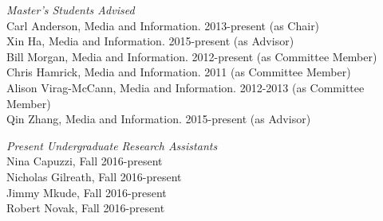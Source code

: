 \documentclass[9pt]{extarticle}
\begin{document}
\emph{Master's Students Advised} \\
Carl Anderson, Media and Information. 2013-present (as Chair) \\
Xin Ha, Media and Information. 2015-present (as Advisor) \\
Bill Morgan, Media and Information. 2012-present (as Committee Member) \\
Chris Hamrick, Media and Information. 2011 (as Committee Member) \\
Alison Virag-McCann, Media and Information. 2012-2013 (as Committee Member) \\
Qin Zhang, Media and Information. 2015-present (as Advisor)

\emph{Present Undergraduate Research Assistants} \\
Nina Capuzzi, Fall 2016-present \\
Nicholas Gilreath, Fall 2016-present \\
Jimmy Mkude, Fall 2016-present \\
Robert Novak, Fall 2016-present
\end{document}
